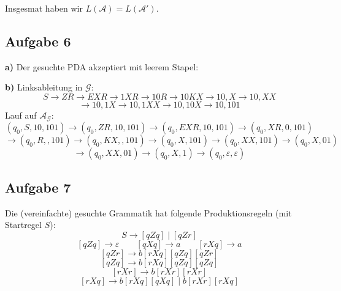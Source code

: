 \documentclass[a4paper,graphics,11pt]{article}
\newcommand{\aufgabe}[1]{\subsection*{Aufgabe #1}}
\begin{document}
Insgesmat haben wir $L(\mathcal{A}) = L(\mathcal{A}')$.

\newpage

\aufgabe{6}
\textbf{a)}
Der gesuchte PDA akzeptiert mit leerem Stapel:
\begin{center}
\end{center}

\textbf{b)}
Linksableitung in $\mathcal{G}:$
$$
    S \to ZR \to EXR \to 1XR \to 10R \to 10KX \to 10,X \to 10,XX
$$$$
    \to 10,1X \to 10,1XX \to 10,10X \to 10,101
$$
Lauf auf $\mathcal{A}_\mathcal{G}:$
$$
    (q_0, S, 10,101) \to
    (q_0, ZR, 10,101) \to
    (q_0, EXR, 10,101) \to
    (q_0, XR, 0,101)
$$$$
    \to (q_0, R, ,101)
    \to (q_0, KX, ,101)
    \to (q_0, X, 101)
    \to (q_0, XX, 101)
    \to (q_0, X, 01)
$$$$
    \to (q_0, XX, 01)
    \to (q_0, X, 1)
    \to (q_0, \varepsilon, \varepsilon)
$$

\newpage

\aufgabe{7}

Die (vereinfachte) gesuchte Grammatik hat folgende Produktionsregeln (mit Startregel $S$):
$$
    S \to [qZq] \mid [qZr]
$$$$
    [qZq] \to \varepsilon
    \qquad
    [qXq] \to a
    \qquad
    [rXq] \to a
$$$$
    [qZr] \to b[rXq][qZq][qZr]
$$$$
    [qZq] \to b[rXq][qZq][qZq]
$$$$
    [rXr] \to b[rXr][rXr]
$$$$
    [rXq] \to b[rXq][qXq]
    \mid
    b[rXr][rXq]
$$
\end{document}
